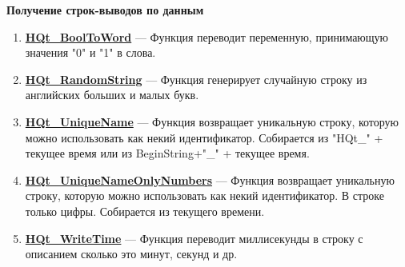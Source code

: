 \documentclass[a4paper,12pt]{article}
\begin{document}
\textbf{Получение строк-выводов по данным}
\begin{enumerate}

\item \textbf{\hyperref[HQt_BoolToWord]{HQt\_BoolToWord}} --- Функция переводит переменную, принимающую значения "0" и "1" в слова.

\item \textbf{\hyperref[HQt_RandomString]{HQt\_RandomString}} --- Функция генерирует случайную строку из английских больших и малых букв.

\item \textbf{\hyperref[HQt_UniqueName]{HQt\_UniqueName}} --- Функция возвращает уникальную строку, которую можно использовать как некий идентификатор. Собирается из "HQt\_" + текущее время или из BeginString+"\_" + текущее время.

\item \textbf{\hyperref[HQt_UniqueNameOnlyNumbers]{HQt\_UniqueNameOnlyNumbers}} --- Функция возвращает уникальную строку, которую можно использовать как некий идентификатор. В строке только цифры. Собирается из текущего времени.

\item \textbf{\hyperref[HQt_WriteTime]{HQt\_WriteTime}} --- Функция переводит миллисекунды в строку с описанием сколько это минут, секунд и др.

\end{enumerate}
\end{document}
